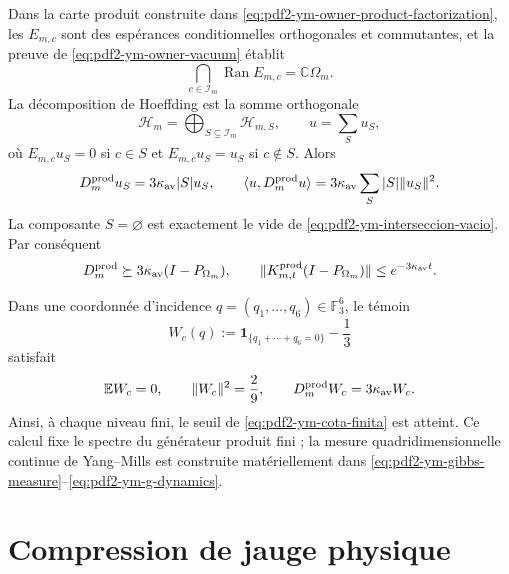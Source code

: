 Dans la carte produit construite dans \eqref{eq:pdf2-ym-owner-product-factorization}, les $E_{m,c}$ sont des espérances conditionnelles orthogonales et commutantes, et la preuve de \eqref{eq:pdf2-ym-owner-vacuum} établit
\begin{equation}\label{eq:pdf2-ym-interseccion-vacio}
 \bigcap_{c\in\mathcal I_m}\operatorname{Ran}E_{m,c}
 =\mathbb C\Omega_m.
\end{equation}
La décomposition de Hoeffding est la somme orthogonale
\[
 \mathcal H_m=\bigoplus_{S\subseteq\mathcal I_m}\mathcal H_{m,S},
 \qquad u=\sum_Su_S,
\]
où $E_{m,c}u_S=0$ si $c\in S$ et $E_{m,c}u_S=u_S$ si $c\notin S$. Alors
\begin{equation}\label{eq:pdf2-ym-hoeffding}
 D_m^{\rm prod}u_S=3\kappa_{\rm av}|S|u_S,
 \qquad
 \langle u,D_m^{\rm prod}u\rangle
 =3\kappa_{\rm av}\sum_S|S|\|u_S\|^2.
\end{equation}
La composante $S=\varnothing$ est exactement le vide de
\eqref{eq:pdf2-ym-interseccion-vacio}. Par conséquent
\begin{equation}\label{eq:pdf2-ym-cota-finita}
 D_m^{\rm prod}\succeq
 3\kappa_{\rm av}(I-P_{\Omega_m}),
 \qquad
 \|K^{\rm prod}_{m,t}(I-P_{\Omega_m})\|
 \le e^{-3\kappa_{\rm av}t}.
\end{equation}

Dans une coordonnée d’incidence
$q=(q_1,\ldots,q_6)\in\mathbb F_3^6$, le témoin
\begin{equation}\label{eq:pdf2-ym-wc}
 W_c(q):=\mathbf1_{\{q_1+\cdots+q_6=0\}}-\frac13
\end{equation}
satisfait
\begin{equation}\label{eq:pdf2-ym-wc-momentos}
 \mathbb EW_c=0,\qquad \|W_c\|^2=\frac29,\qquad
 D_m^{\rm prod}W_c=3\kappa_{\rm av}W_c.
\end{equation}
Ainsi, à chaque niveau fini, le seuil de \eqref{eq:pdf2-ym-cota-finita} est atteint. Ce calcul fixe le spectre du générateur produit fini ; la mesure quadridimensionnelle continue de Yang--Mills est construite matériellement dans \eqref{eq:pdf2-ym-gibbs-measure}--\eqref{eq:pdf2-ym-g-dynamics}.

\section{Compression de jauge physique}

